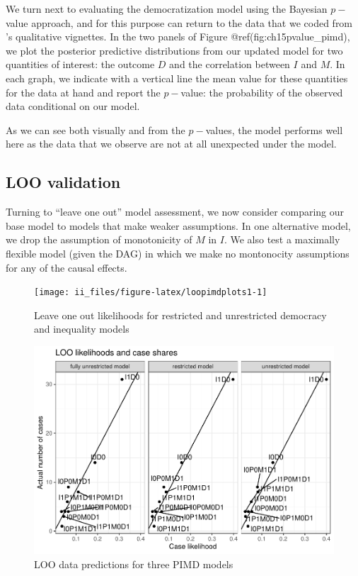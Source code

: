 \documentclass[
  12pt,
]{book}
\begin{document}
We turn next to evaluating the democratization model using the Bayesian \(p-\)value approach, and for this purpose can return to the data that we coded from \citet{haggard2012distributive}'s qualitative vignettes. In the two panels of Figure @ref(fig:ch15pvalue\_pimd), we plot the posterior predictive distributions from our updated model for two quantities of interest: the outcome \(D\) and the correlation between \(I\) and \(M\). In each graph, we indicate with a vertical line the mean value for these quantities for the data at hand and report the \(p-\)value: the probability of the observed data conditional on our model.

As we can see both visually and from the \(p-\)values, the model performs well here as the data that we observe are not at all unexpected under the model.

\hypertarget{loo-validation}{%
\subsection{LOO validation}\label{loo-validation}}

Turning to ``leave one out'' model assessment, we now consider comparing our base model to models that make weaker assumptions. In one alternative model, we drop the assumption of monotonicity of \(M\) in \(I\). We also test a maximally flexible model (given the DAG) in which we make no montonocity assumptions for any of the causal effects.

\begin{figure}

{\centering \texttt{[image: ii\_files/figure-latex/loopimdplots1-1]} 

}

\caption{Leave one out likelihoods for restricted and unrestricted democracy and inequality models}\label{fig:loopimdplots1}
\end{figure}

\begin{figure}

{\centering \includegraphics{ii_files/figure-latex/pimdloocomp-1} 

}

\caption{LOO data predictions for three PIMD models}\label{fig:pimdloocomp}
\end{figure}
\end{document}
